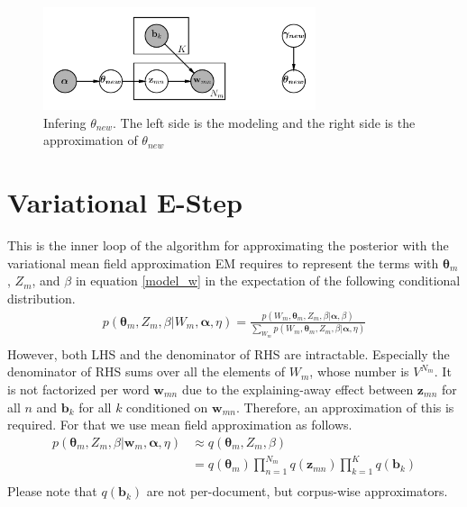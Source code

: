 \documentclass[a4]{article}
\begin{document}
\begin{figure}
\centering
\includegraphics[width=8cm]{lda_inference.png}
\caption{Infering $\theta_{new}$. The left side is the modeling and the right side is the approximation of $\theta_{new}$}
\label{fig:lda_inference}
\end{figure}








\section{
    Variational E-Step
}\label{variational E-step}
This is the inner loop of the algorithm for approximating the posterior with the variational mean field approximation
EM requires to represent the terms with
    $\bm{\theta}_m$, $Z_m$, and $\beta$
in equation \ref{model_w} in the expectation of the following conditional distribution. 
\begin{equation}
\begin{aligned}
p( \bm{\theta}_m, Z_{m}, \beta | W_m, \bm{\alpha}, \eta ) =
    \frac{ p( W_m, \bm{\theta}_m, Z_{m}, \beta | \bm{\alpha}, \beta ) }
         { \sum_{W_m} 
               p( W_m, \bm{\theta}_m, Z_{m}, \beta | \bm{\alpha}, \eta ) }
\label{EM_conditional}\\
\end{aligned}
\end{equation}
However, both LHS and the denominator of RHS are intractable.
Especially the denominator of RHS sums over all the elements of $W_{m}$,
whose number is $V^{N_m}$. It is not factorized per word $\mathbf{w}_{mn}$ due to
the explaining-away effect between $\mathbf{z}_{mn}$ for all $n$ and $\mathbf{b}_k$ for all $k$ conditioned on
$\mathbf{w}_{mn}$.
Therefore, an approximation of this is required. For that we use 
mean field approximation as follows.
\begin{equation}
\begin{aligned}
  p( \bm{\theta}_m, Z_{m}, \beta | \mathbf{w}_m, \bm{\alpha}, \eta )
  &\approx
      q(\bm{\theta}_m , Z_{m}, \beta )\\
  &= q( \bm{\theta}_m )
     \prod_{n = 1}^{N_m} q( \mathbf{z}_{mn} )
     \prod_{k=1}^{K} q( \mathbf{b}_k )\label{q_forEM}\\
\end{aligned}
\end{equation}
Please note that $q( \mathbf{b}_k )$ are not per-document, but corpus-wise approximators.
\end{document}
